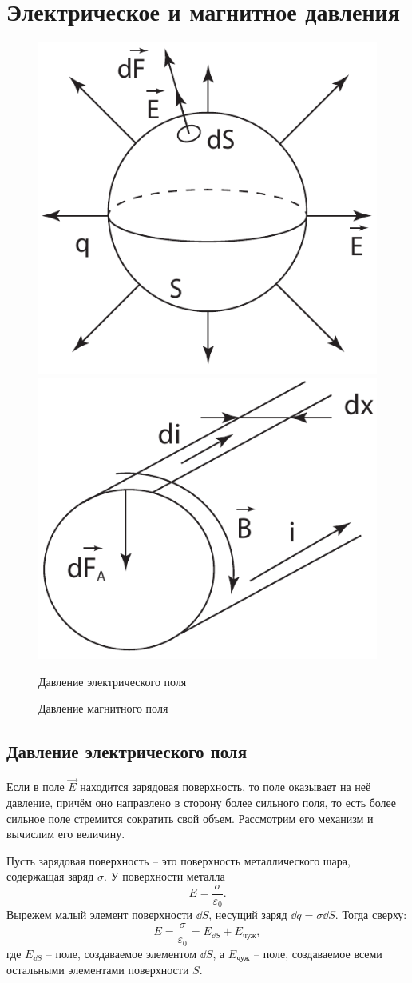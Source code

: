 \section{Электрическое и магнитное давления}

    \begin{figure}[h]
        \center
        \includegraphics[width=.47\textwidth]{lec12/electric_pressure.pdf}
        \hfill
        \includegraphics[width=.47\textwidth]{lec12/magnetic_pressure.pdf}
        \parbox[t]{.47\textwidth}{\caption{Давление электрического поля}}
        \hfill
        \parbox[t]{.47\textwidth}{\caption{Давление магнитного поля}}
    \end{figure}
\subsection{Давление электрического поля}

    Если в поле \( \vec{E} \) находится зарядовая поверхность, то поле оказывает
    на неё давление, причём оно направлено в сторону более сильного поля, то
    есть более сильное поле стремится сократить свой объем. Рассмотрим его
    механизм и вычислим его величину.
    
    Пусть зарядовая поверхность -- это поверхность металлического шара,
    содержащая заряд \( \sigma \). У поверхности металла
    \[
        E = \frac{\sigma}{\varepsilon_0}.
    \]
    Вырежем малый элемент поверхности \( \dd S \), несущий заряд
    \( \dd q = \sigma\dd S \).
    Тогда сверху:
    \[
        E = \frac{\sigma}{\varepsilon_0} = E_{\dd S} + E_{\textit{чуж}},
    \]
    где \( E_{\dd S} \) -- поле, создаваемое элементом \( \dd S \), а 
    \( E_{\textit{чуж}} \) -- поле, создаваемое всеми остальными элементами
    поверхности \( S \).
    

